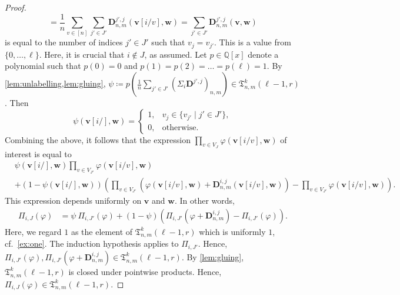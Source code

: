 \documentclass[10pt,a4paper]{article}
\theoremstyle{definition}
\theoremstyle{plain}
\theoremstyle{remark}
\renewcommand{\phi}{\varphi}
\begin{document}
\begin{proof}
\[			= \frac1n \sum_{v \in [n]} \sum_{j' \in J'}\boldsymbol{D}^{j', j}_{n,m}(\boldsymbol{v}[i/v], \boldsymbol{w})
			= \sum_{j' \in J'} \boldsymbol{D}^{j', j}_{n,m}(\boldsymbol{v}, \boldsymbol{w})
		\]
		is equal to the number of indices $j' \in J'$ such that $v_j = v_{j'}$.
		This is a value from $\{0, \dots, \ell\}$.
		Here, it is crucial that $i \not\in J$, as assumed.
		Let $p \in \mathbb{Q}[x]$ denote a polynomial such that $p(0) = 0$ and $p(1) = p(2) = \dots = p(\ell) = 1$.
		By \cref{lem:unlabelling,lem:gluing},
		$\psi \coloneqq p(\frac1n \sum_{j' \in J'} (\Sigma_i\boldsymbol{D}^{j', j})_{n,m}) \in \mathfrak{T}_{n,m}^k(\ell-1, r)$.
		Then
		\begin{equation*}
			\psi(\boldsymbol{v}[i/], \boldsymbol{w}) = \begin{cases}
				1, & v_j \in \{v_{j'} \mid j' \in J'\}, \\
				0, & \text{otherwise}.
			\end{cases}
		\end{equation*}
		Combining the above,
		it follows that the expression $\prod_{v \in V_{J}}
		\phi(\boldsymbol{v}[i/v], \boldsymbol{w})$ of interest is equal to
		\begin{align*}
			&\psi(\boldsymbol{v}[i/], \boldsymbol{w})
			\prod_{v \in V_{J'}} \phi(\boldsymbol{v}[i/v], \boldsymbol{w}) \\
			&+
			(1-\psi(\boldsymbol{v}[i/], \boldsymbol{w}))
			\left(\prod_{v \in V_{J'}}
			\left( \phi(\boldsymbol{v}[i/v], \boldsymbol{w}) + \boldsymbol{D}^{i, j}_{n, m}(\boldsymbol{v}[i/v], \boldsymbol{w}) \right) 
			- \prod_{v \in V_{J'}}  \phi(\boldsymbol{v}[i/v], \boldsymbol{w}) \right).
		\end{align*}
		This expression depends uniformly on $\boldsymbol{v}$ and $\boldsymbol{w}$.
		In other words,
		\begin{align*}
			\Pi_{i, J} (\phi) &= \psi \ \Pi_{i, J'}( \phi) + (1- \psi) \left( \Pi_{i,J'}(\phi + \boldsymbol{D}^{i,j}_{n,m}) - \Pi_{i, J'} (\phi) \right).
		\end{align*}
		Here, we regard $1$ as the element of $\mathfrak{T}^k_{n,m}(\ell-1, r)$ which is uniformly $1$, cf.\ \cref{ex:one}.
		The induction hypothesis applies to $\Pi_{i, J'}$.
		Hence, $\Pi_{i, J'}( \phi),\Pi_{i,J'}(\phi + \boldsymbol{D}^{i,j}_{n,m}) \in \mathfrak{T}^{k}_{n,m}(\ell-1,r)$.
		By \cref{lem:gluing}, $\mathfrak{T}^k_{n,m}(\ell-1, r)$ is closed under pointwise products.
		Hence, $\Pi_{i, J} (\phi) \in \mathfrak{T}^k_{n,m}(\ell-1, r)$.
	\end{proof}
\end{document}
